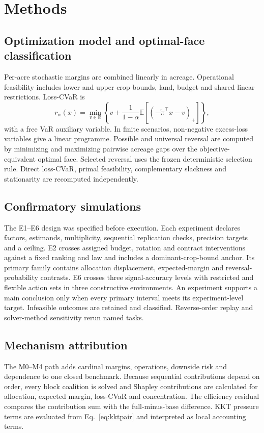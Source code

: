 \section{Methods}

\subsection{Optimization model and optimal-face classification}
Per-acre stochastic margins are combined linearly in acreage. Operational feasibility includes lower and upper crop bounds, land, budget and shared linear restrictions. Loss-CVaR is
\begin{equation}
r_\alpha(x)=\min_{v\in\mathbb R}\left\{v+\frac{1}{1-\alpha}\mathbb E[(-\widetilde\pi^\top x-v)_+]\right\},
\end{equation}
with a free VaR auxiliary variable. In finite scenarios, non-negative excess-loss variables give a linear programme. Possible and universal reversal are computed by minimizing and maximizing pairwise acreage gaps over the objective-equivalent optimal face. Selected reversal uses the frozen deterministic selection rule. Direct loss-CVaR, primal feasibility, complementary slackness and stationarity are recomputed independently.

\subsection{Confirmatory simulations}
The E1--E6 design was specified before execution. Each experiment declares factors, estimands, multiplicity, sequential replication checks, precision targets and a ceiling. E2 crosses assigned budget, rotation and contract interventions against a fixed ranking and law and includes a dominant-crop-bound anchor. Its primary family contains allocation displacement, expected-margin and reversal-probability contrasts. E6 crosses three signal-accuracy levels with restricted and flexible action sets in three constructive environments. An experiment supports a main conclusion only when every primary interval meets its experiment-level target. Infeasible outcomes are retained and classified. Reverse-order replay and solver-method sensitivity rerun named tasks.

\subsection{Mechanism attribution}
The M0--M4 path adds cardinal margins, operations, downside risk and dependence to one closed benchmark. Because sequential contributions depend on order, every block coalition is solved and Shapley contributions are calculated for allocation, expected margin, loss-CVaR and concentration. The efficiency residual compares the contribution sum with the full-minus-base difference. KKT pressure terms are evaluated from Eq.~\ref{eq:kktpair} and interpreted as local accounting terms.

